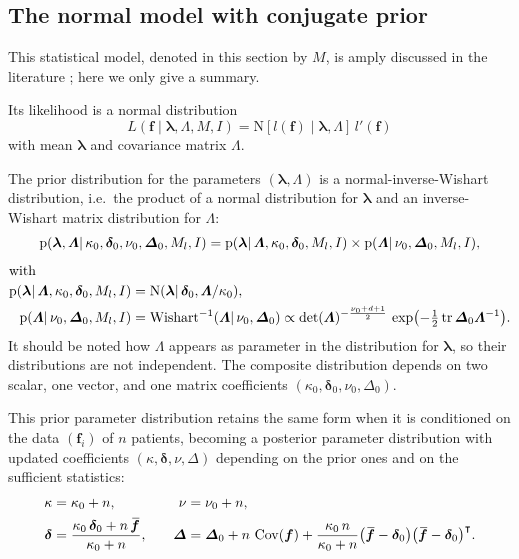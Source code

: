 \documentclass[%
]{frontiersSCNS-nologo} %
\newcommand*{\sect}{\S} %
\newcommand*{\ie}{i.e.}
\newcommand*{\widebar}[1]{{\mkern1.5mu\skew{2}\overline{\mkern-1.5mu#1\mkern-1.5mu}\mkern 1.5mu}}
\newcommand*{\pf}{\mathrm{p}}%
\renewcommand*{\|}{\mathpunct{|}}%
\newcommand*{\T}{^\intercal}%
\newcommand*{\yxx}{f}
\newcommand*{\yx}{\bm{\yxx}}
\newcommand*{\ylm}{\lambda}
\newcommand*{\ylmm}{\bm{\ylm}}
\newcommand*{\yls}{\varLambda}
\newcommand*{\ylss}{\bm{\yls}}
\newcommand*{\yn}{n}
\newcommand*{\yd}{d}
\newcommand*{\yI}{I}
\newcommand*{\yM}{M}
\newcommand*{\yMl}{\yM_l}
\newcommand*{\ytr}{l}
\newcommand*{\av}{\widebar}
\DeclareMathOperator{\Cov}{Cov}%
\newcommand*{\yL}{L}
\newcommand*{\dnormal}{\mathrm{N}}
\DeclareMathOperator{\diwishart}{Wishart^{-1}}
\newcommand*{\ymu}{\bm{\delta}}
\newcommand*{\yka}{\kappa}
\newcommand*{\ynu}{\nu}
\newcommand*{\yLa}{\bm{\varDelta}}
\newcommand*{\ymuo}{\ymu_0}
\newcommand*{\ykao}{\yka_0}
\newcommand*{\ynuo}{\ynu_0}
\newcommand*{\yLao}{\yLa_0}
\DeclareMathOperator{\tr}{tr}
\begin{document}
\subsection{The normal model with conjugate prior}
\label{sec:normal-inverse-wishart}

This statistical model, denoted in this section by $\yM$, is amply
discussed in the literature
\citetext{\citealp[\sect~3.6]{gelmanetal1995_r2014};
  \citealp{minka1998_r2001,murphy2007}}; here we only give a summary.

Its likelihood is a normal distribution
\begin{equation}
  \label{eq:likelihood_normal}
  \yL(\yx \| \ylmm, \ylss, \yM, \yI)
  =
  \dnormal[\ytr(\yx) \| \ylmm, \ylss]\, \ytr'(\yx)
\end{equation}
with mean $\ylmm$ and covariance matrix $\ylss$.

The prior distribution for the parameters $(\ylmm, \ylss)$ is a
normal-inverse-Wishart distribution, \ie\ the product of a normal
distribution for $\ylmm$ and an inverse-Wishart matrix distribution \citetext{\citealp[\sect~3.4]{guptaetal2000}; \citealp{tiaoetal1964};
  \citealp[\sect~3.2.5]{bernardoetal1994_r2000}} for $\ylss$:
\begin{gather}
  \label{eq:logit-normal_parameters_factor_individual}
  \pf(\ylmm, \ylss \|\ykao,\ymuo,\ynuo,\yLao,\yMl, \yI) =
  \pf( \ylmm\| \ylss, \ykao,\ymuo, \yMl, \yI)
  \times \pf( \ylss\| \ynuo,\yLao, \yMl, \yI),
  \\[\jot]
  \shortintertext{with}
  \begin{aligned}
    \label{eq:logit-normal_parameters}
    \pf( \ylmm\| \ylss, \ykao, \ymuo, \yMl, \yI)
    &= \dnormal(\ylmm \| \ymuo, \ylss/\ykao),
    \\
    \pf( \ylss\| \ynuo,\yLao, \yMl, \yI)
    &= \diwishart(\ylss \| \ynuo, \yLao)\propto
      \det(\ylss)^{-\frac{\ynuo+\yd+1}{2}}
      \,
      \exp\bigl(-\tfrac{1}{2} \tr\yLao\ylss^{-1}\bigr).
  \end{aligned}
\end{gather}
It should be noted how $\ylss$ appears as parameter in the distribution for
$\ylmm$, so their distributions are not independent. The composite
distribution depends on two scalar, one vector, and one matrix coefficients
$(\ykao,\ymuo,\ynuo,\yLao)$.

This prior parameter distribution retains the same form when it is
conditioned on the data $(\yx_i)$ of $\yn$ patients, becoming a posterior
parameter distribution with updated coefficients $(\yka,\ymu,\ynu,\yLa)$
depending on the prior ones and on the sufficient statistics:
\begin{equation}
  \label{eq:update_coeffs}
    \begin{aligned}
    \yka &= \ykao + \yn,\quad     &\ynu &= \ynuo + \yn,\\
    \ymu &= \frac{\ykao\,\ymuo+\yn\, \av{\yx}}{\ykao+\yn},\quad
    &\yLa &= \yLao + \yn\, \Cov(\yx)
           + \frac{\ykao\,\yn}{\ykao+\yn} \bigl(\av{\yx}-\ymuo\bigr) \bigl(\av{\yx}-\ymuo\bigr)\T.
  \end{aligned}
\end{equation}
\end{document}
